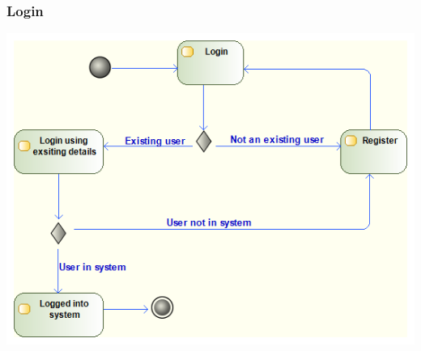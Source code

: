 \documentclass[11pt]{article}
\begin{document}
\newpage
\subsubsection{Login}
\begin{center} 
	\includegraphics[width=\textwidth]{../Images/Login_Activity_Diagram.png}\\[0.5cm]
\end{center}

\newpage
\end{document}
